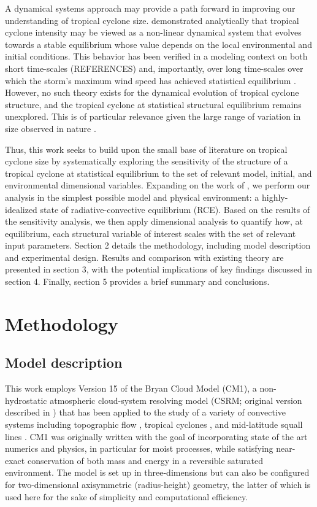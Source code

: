 \documentclass[12pt]{article}
\begin{document}
A dynamical systems approach may provide a path forward in improving our understanding of tropical cyclone size. \cite{Tang_Emanuel_2010} demonstrated analytically that tropical cyclone intensity may be viewed as a non-linear dynamical system that evolves towards a stable equilibrium whose value depends on the local environmental and initial conditions. This behavior has been verified in a modeling context on both short time-scales (REFERENCES) and, importantly, over long time-scales over which the storm's maximum wind speed has achieved statistical equilibrium \citep{Hakim_2011}.  However, no such theory exists for the dynamical evolution of tropical cyclone structure, and the tropical cyclone at statistical structural equilibrium remains unexplored. This is of particular relevance given the large range of variation in size observed in nature \citep{Chavas_Emanuel_2010}.

Thus, this work seeks to build upon the small base of literature on tropical cyclone size by systematically exploring the sensitivity of the structure of a tropical cyclone at statistical equilibrium to the set of relevant model, initial, and environmental dimensional variables. Expanding on the work of \cite{Hakim_2011}, we perform our analysis in the simplest possible model and physical environment: a highly-idealized state of radiative-convective equilibrium (RCE). Based on the results of the sensitivity analysis, we then apply dimensional analysis to quantify how, at equilibrium, each structural variable of interest scales with the set of relevant input parameters. Section 2 details the methodology, including model description and experimental design. Results and comparison with existing theory are presented in section 3, with the potential implications of key findings discussed in section 4. Finally, section 5 provides a brief summary and conclusions.

\section{Methodology}

\subsection{Model description}
This work employs Version 15 of the Bryan Cloud Model (CM1), a non-hydrostatic atmospheric cloud-system resolving model (CSRM; original version described in \cite{Bryan_Fritsch_2002}) that has been applied to the study of a variety of convective systems including topographic flow \citep{Miglietta_Rotunno_2010}, tropical cyclones \citep{Bryan_Rotunno_2009b}, and mid-latitude squall lines \citep{Parker_2008}.  CM1 was originally written with the goal of incorporating state of the art numerics and physics, in particular for moist processes, while satisfying near-exact conservation of both mass and energy in a reversible saturated environment. The model is set up in three-dimensions but can also be configured for two-dimensional axisymmetric (radius-height) geometry, the latter of which is used here for the sake of simplicity and computational efficiency.
\end{document}
